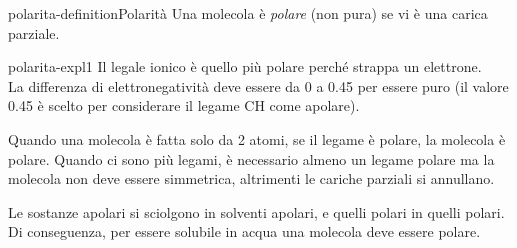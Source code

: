 \documentclass[preview]{standalone}
\begin{document}
\genpage

\begin{snippetdefinition}{polarita-definition}{Polarità}
    Una molecola è \textit{polare} (non pura) se vi è una carica parziale.
\end{snippetdefinition}

\begin{snippet}{polarita-expl1}
    Il legale ionico è quello più polare perché strappa un elettrone. \\
    La differenza di elettronegatività deve essere da 0 a 0.45 per essere puro
    (il valore 0.45 è scelto per considerare il legame CH come apolare).

    Quando una molecola è fatta solo da 2 atomi, 
    se il legame è polare, la molecola è polare.
    Quando ci sono più legami, è necessario almeno un legame polare
    ma la molecola non deve essere simmetrica, altrimenti le cariche parziali si annullano.

    Le sostanze apolari si sciolgono in solventi apolari, e quelli polari in quelli polari.
    Di conseguenza, per essere solubile in acqua una molecola deve essere polare.
\end{snippet}
\end{document}
